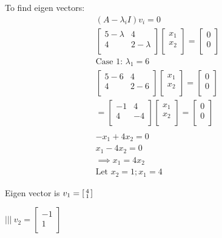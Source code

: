 \documentclass[english,course,fleqn]{lecture}
\newenvironment{qanda}{\begin{enumerate}\setlength{\parindent}{0pt}}{\medskip\end{enumerate}}
\begin{document}
\begin{qanda}
  To find eigen vectors:
  \begin{gather*}
    (A - \lambda_{i}I)v_{i} = 0\\
    \begin{bmatrix}
      5 - \lambda & 4 \\
      4 & 2 - \lambda \\
    \end{bmatrix} \begin{bmatrix}
      x_{1} \\
      x_{2} \\
    \end{bmatrix} = \begin{bmatrix}
      0 \\
      0 \\
    \end{bmatrix}\\
    \text{Case 1: } \lambda_{1} = 6\\
    \begin{bmatrix}
      5 - 6 & 4 \\
      4 & 2 - 6 \\
    \end{bmatrix} \begin{bmatrix}
      x_{1} \\
      x_{2} \\
    \end{bmatrix} = \begin{bmatrix}
      0 \\
      0 \\
    \end{bmatrix}\\
    = \begin{bmatrix}
      -1 & 4 \\
      4 & -4 \\
    \end{bmatrix} \begin{bmatrix}
      x_{1} \\
      x_{2} \\
    \end{bmatrix} = \begin{bmatrix}
      0 \\
      0 \\
    \end{bmatrix}\\
    \\
    -x_{1} + 4 x_{2} = 0\\
    x_{1} - 4 x_{2} = 0\\
    \implies x_{1} = 4 x_{2}\\
    \text{Let } x_{2} = 1; x_{1} = 4
  \end{gather*}

  Eigen vector is $v_{1} = \begin{bsmallmatrix}
    4 \\
    1 \\
  \end{bsmallmatrix}$

  $||| ~ v_{2} = \begin{bmatrix}
    -1 \\
    1 \\
  \end{bmatrix}$
\end{qanda}
\end{document}
